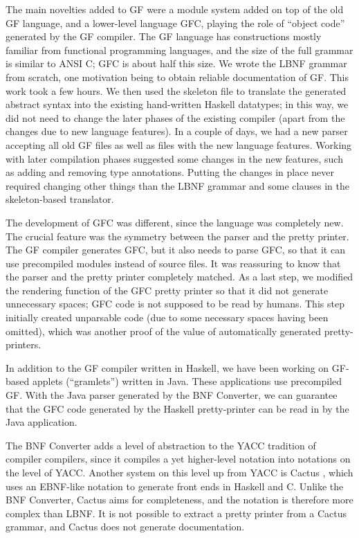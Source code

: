 The main novelties added to GF were 
a module system added on top of the old GF language, 
and a lower-level language GFC, playing the role of 
``object code'' generated by the GF compiler. 
The GF language has constructions mostly familiar from functional
programming languages,
and the size of the full grammar is similar
to ANSI C; GFC is about half this size. 
We wrote the LBNF grammar from scratch, one motivation
being to obtain reliable documentation of GF. 
This work took a few hours. We then used the skeleton file
to translate the generated abstract syntax into the existing
hand-written Haskell datatypes; in this way, we did not 
need to change the later phases of the existing compiler (apart from
the changes due to new language features). In a couple of days,
we had a new parser accepting all old GF files as well as 
files with the new language features. Working with later compilation
phases suggested some changes in the new features, such as adding
and removing type annotations. Putting the changes in place never required
changing other things than the LBNF grammar and some clauses in
the skeleton-based translator.

The development of GFC was different, since the language
was completely new. The crucial feature was the symmetry between
the parser and the pretty printer. The GF compiler generates 
GFC, but it also needs to parse GFC, so that it can use precompiled
modules instead of source files. It was reassuring to know
that the parser and the pretty printer completely matched.
As a last step, we modified the rendering function of the GFC
pretty printer so that it did not generate unnecessary spaces;
GFC code is not supposed to be read by humans. This step initially
created unparsable code (due to some necessary spaces having been
omitted), which was another proof of the value of automatically
generated pretty-printers.

In addition to the GF compiler written in Haskell, we have been
working on GF-based applets (``gramlets'') written in Java.
These applications use precompiled GF. With the Java parser
generated by the BNF Converter, we can guarantee that the GFC code generated
by the Haskell pretty-printer can be read in by the Java application.


The BNF Converter adds a level of abstraction to the YACC \cite{johnson-yacc} 
tradition of compiler compilers,
since it compiles a yet higher-level notation into
notations on the level of YACC.
Another system on this 
level up from YACC is Cactus \cite{Cactus},
which uses an EBNF-like notation to 
generate front ends in Haskell and C.
Unlike the BNF Converter, Cactus aims for completeness,
and the notation is therefore more complex than LBNF. 
It is not possible to extract a pretty printer from a Cactus grammar, 
and Cactus does not generate documentation.

